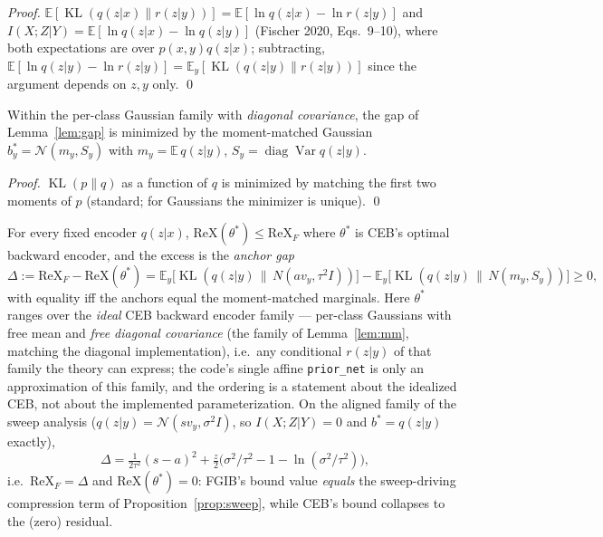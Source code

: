 \begin{proof}
$\mathbb{E}[\operatorname{KL}(q(z|x)\|r(z|y))] = \mathbb{E}[\ln q(z|x) - \ln r(z|y)]$
and $I(X;Z|Y) = \mathbb{E}[\ln q(z|x) - \ln q(z|y)]$ (Fischer 2020, Eqs.~9--10), where
both expectations are over $p(x,y)q(z|x)$; subtracting,
$\mathbb{E}[\ln q(z|y) - \ln r(z|y)] = \mathbb{E}_y[\operatorname{KL}(q(z|y)\|r(z|y))]$
since the argument depends on $z, y$ only. \hfill\qed
\end{proof}

\begin{lemma}\label{lem:mm}
Within the per-class Gaussian family with \emph{diagonal covariance}, the gap of
Lemma~\ref{lem:gap} is
minimized by the moment-matched Gaussian $b^*_y = \mathcal{N}(m_y, S_y)$ with
$m_y = \mathbb{E}\,q(z|y)$, $S_y = \operatorname{diag}\operatorname{Var} q(z|y)$.
\end{lemma}

\begin{proof}
$\operatorname{KL}(p\|q)$ as a function of $q$ is minimized by matching the first two
moments of $p$ (standard; for Gaussians the minimizer is unique). \hfill\qed
\end{proof}

\begin{proposition}\label{prop:ordering}
For every fixed encoder $q(z|x)$,
$\mathrm{ReX}(\theta^*) \le \mathrm{ReX}_F$ where $\theta^*$ is CEB's optimal backward
encoder, and the excess is the \emph{anchor gap}
\begin{equation}
\Delta := \mathrm{ReX}_F - \mathrm{ReX}(\theta^*)
= \mathbb{E}_y\big[\operatorname{KL}(q(z|y)\,\|\,N(a v_y, \tau^2 I))\big]
- \mathbb{E}_y\big[\operatorname{KL}(q(z|y)\,\|\,N(m_y, S_y))\big] \ge 0 ,
\label{eq:anchor-gap}
\end{equation}
with equality iff the anchors equal the moment-matched marginals. Here $\theta^*$ ranges
over the \emph{ideal} CEB backward encoder family --- per-class Gaussians with free mean
and \emph{free diagonal covariance} (the family of Lemma~\ref{lem:mm}, matching the
diagonal implementation), i.e.\ any conditional $r(z|y)$ of that family the theory can
express; the code's
single affine \texttt{prior\_net} is only an approximation of this family, and the
ordering is a statement about the idealized CEB, not about the implemented
parameterization.
On the aligned family of the sweep analysis ($q(z|y) = \mathcal{N}(s v_y, \sigma^2 I)$,
so $I(X;Z|Y) = 0$ and $b^* = q(z|y)$ exactly),
\begin{equation}
\Delta = \tfrac{1}{2\tau^2}(s-a)^2 + \tfrac{z}{2}\big(\sigma^2/\tau^2 - 1 - \ln(\sigma^2/\tau^2)\big) ,
\label{eq:aligned-gap}
\end{equation}
i.e.\ $\mathrm{ReX}_F = \Delta$ and $\mathrm{ReX}(\theta^*) = 0$: FGIB's bound value
\emph{equals} the sweep-driving compression term of Proposition~\ref{prop:sweep}, while
CEB's bound collapses to the (zero) residual.
\end{proposition}

